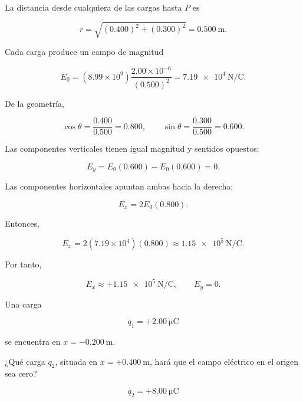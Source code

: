 \begin{explicacion}

La distancia desde cualquiera de las cargas hasta \(P\) es

\[
r=\sqrt{(0.400)^2+(0.300)^2}=\SI{0.500}{\metre}.
\]

Cada carga produce un campo de magnitud

\[
E_0=(8.99\times10^9)\frac{2.00\times10^{-6}}{(0.500)^2}
=\SI{7.19e4}{\newton\per\coulomb}.
\]

De la geometría,

\[
\cos\theta=\frac{0.400}{0.500}=0.800,
\qquad
\sin\theta=\frac{0.300}{0.500}=0.600.
\]

Las componentes verticales tienen igual magnitud y sentidos opuestos:

\[
E_y=E_0(0.600)-E_0(0.600)=0.
\]

Las componentes horizontales apuntan ambas hacia la derecha:

\[
E_x=2E_0(0.800).
\]

Entonces,

\[
E_x=2(7.19\times10^4)(0.800)
\approx\SI{1.15e5}{\newton\per\coulomb}.
\]

Por tanto,

\[
\boxed{E_x\approx+\SI{1.15e5}{\newton\per\coulomb}},
\qquad
\boxed{E_y=0}.
\]

\end{explicacion}


\begin{ejercicio}

Una carga

\[
q_1=+\SI{2.00}{\micro\coulomb}
\]

se encuentra en \(x=-\SI{0.200}{\metre}\).

¿Qué carga \(q_2\), situada en \(x=+\SI{0.400}{\metre}\), hará que el campo eléctrico en el origen sea cero?

\end{ejercicio}

\begin{respuesta}

\[
\boxed{q_2=+\SI{8.00}{\micro\coulomb}}
\]

\end{respuesta}

